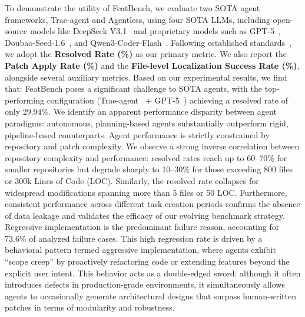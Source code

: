 

To demonstrate the utility of FeatBench, we evaluate two SOTA agent frameworks, Trae-agent and Agentless, using four SOTA LLMs, including open-source models like DeepSeek V3.1~\cite{deepseek} and proprietary models such as GPT-5~\cite{gpt-5}, Doubao-Seed-1.6~\cite{doubao}, and Qwen3-Coder-Flash~\cite{qwen3}. Following established standards~\cite{deng2025nocode, swebenchgoeslive}, we adopt the \textbf{Resolved Rate (\%)} as our primary metric. We also report the \textbf{Patch Apply Rate (\%)} and the \textbf{File-level Localization Success Rate (\%)}, alongside several auxiliary metrics. Based on our experimental results, we find that:
 FeatBench poses a significant challenge to SOTA agents, with the top-performing configuration (Trae-agent~\cite{traeagent} + GPT-5~\cite{gpt-5}) achieving a resolved rate of only 29.94\%. We identify an apparent performance disparity between agent paradigms: autonomous, planning-based agents substantially outperform rigid, pipeline-based counterparts.
 Agent performance is strictly constrained by repository and patch complexity. We observe a strong inverse correlation between repository complexity and performance: resolved rates reach up to 60–70\% for smaller repositories but degrade sharply to 10–30\% for those exceeding 800 files or 300k Lines of Code (LOC). Similarly, the resolved rate collapses for widespread modifications spanning more than 5 files or 50 LOC. Furthermore, consistent performance across different task creation periods confirms the absence of data leakage and validates the efficacy of our evolving benchmark strategy.
 Regressive implementation is the predominant failure reason, accounting for 73.6\% of analyzed failure cases. This high regression rate is driven by a behavioral pattern termed aggressive implementation, where agents exhibit ``scope creep'' by proactively refactoring code or extending features beyond the explicit user intent. This behavior acts as a double-edged sword: although it often introduces defects in production-grade environments, it simultaneously allows agents to occasionally generate architectural designs that surpass human-written patches in terms of modularity and robustness.


